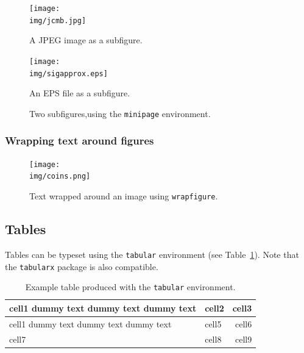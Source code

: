 \begin{figure}[H]
    \centering
    \begin{minipage}{.35\textwidth}
        \centering
        \texttt{[image: \\img/jcmb.jpg]}
        \caption{A JPEG image as a subfigure.}
        \label{fig:mp-jcmb}
    \end{minipage}%
    \begin{minipage}{0.6\textwidth}
        \centering
        \texttt{[image: \\img/sigapprox.eps]}
        \caption{An EPS file as a subfigure.}
        \label{fig:mp-sig}
    \end{minipage}
    \caption{Two subfigures,using the \texttt{minipage} environment.}
    \label{fig:minpage}
\end{figure}


\subsubsection{Wrapping text around figures}
\label{float:wrap}

\begin{figure}
    \centering
    \texttt{[image: \\img/coins.png]}
    \caption{Text wrapped around an image using \texttt{wrapfigure}.}
    \label{fig:wrap}
\end{figure}

\lipsum[1-2]


\subsection{Tables}
\label{float:tab}

Tables can be typeset using the \texttt{tabular} environment (see Table~\ref{tab:tabular}). Note that the \texttt{tabularx} package is also compatible.

\begin{table}
    \centering
    \begin{tabular}{| l | l | r |} 
      \hline
      cell1 dummy text dummy text dummy text & cell2 & cell3 \\ 
      \hline
      cell1 dummy text dummy text dummy text & cell5 & cell6 \\ 
      \hline
      cell7 & cell8 & cell9 \\ 
      \hline
    \end{tabular}

    \caption{Example table produced with the \texttt{tabular} environment.}
    \label{tab:tabular}
\end{table}



